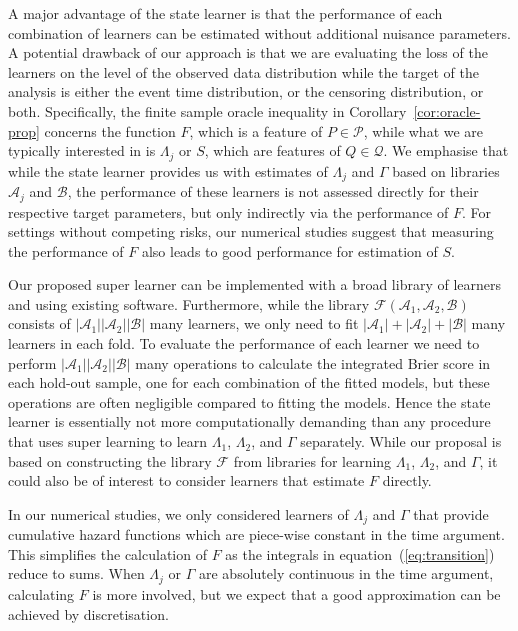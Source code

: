 \documentclass[a4paper,danish]{article}
\theoremstyle{plain} %
\numberwithin{theorem}{section}
\theoremstyle{definition} %
\theoremstyle{remark}
\newcommand{\1}{\mathds{1}}
\begin{document}
A major advantage of the state learner is that the performance of each
combination of learners can be estimated without additional nuisance
parameters. A potential drawback of our approach is that we are
evaluating the loss of the learners on the level of the observed data
distribution while the target of the analysis is either the event time
distribution, or the censoring distribution, or both.
Specifically, the finite sample oracle inequality in
Corollary~\ref{cor:oracle-prop} concerns the function \( F \), which
is a feature of \( P \in \mathcal{P} \), while what we are typically
interested in is \( \Lambda_j \) or \( S \), which are features of
\( Q \in \mathcal{Q} \). We emphasise that while the state learner
provides us with estimates of \( \Lambda_j \) and $\Gamma$ based on
libraries \( \mathcal{A}_j \) and \( \mathcal{B} \), the performance
of these learners is not assessed directly for their respective target
parameters, but only indirectly via the performance of \( F \).  For
settings without competing risks, our numerical studies suggest that
measuring the performance of \( F \) also leads to good performance
for estimation of \( S \).

Our proposed super learner can be implemented with a broad library of learners
and using existing software.
Furthermore, while
the library \( \mathcal{F}(\mathcal{A}_1,\mathcal{A}_2,\mathcal{B}) \) consists
of \( |\mathcal{A}_1||\mathcal{A}_2||\mathcal{B}| \) many learners, we only need to fit
\( |\mathcal{A}_1| +|\mathcal{A}_2| + |\mathcal{B}| \) many learners in each fold. To
evaluate the performance of each learner we need to perform
\( |\mathcal{A}_1||\mathcal{A}_2||\mathcal{B}| \) many operations to calculate the
integrated Brier score in each hold-out sample, one for each combination of the
fitted models, but these operations are often negligible compared to fitting the
models. Hence the state learner is essentially not more computationally demanding
than any procedure that uses super learning to learn $\Lambda_1$, $\Lambda_2$,
and $\Gamma$ separately. While our proposal is based on constructing the library
\( \mathcal{F} \) from libraries for learning \( \Lambda_1 \), $\Lambda_2$, and
$\Gamma$, it could also be of interest to consider learners that estimate
\( F \) directly.

In our numerical studies, we only considered learners of $\Lambda_j$ and
$\Gamma$ that provide cumulative hazard functions which are piece-wise constant
in the time argument. This simplifies the calculation of \( F \) as the
integrals in equation~(\ref{eq:transition}) reduce to sums. When $\Lambda_j$ or
\( \Gamma \) are absolutely continuous in the time argument, calculating \( F \)
is more involved, but we expect that a good approximation can be achieved by
discretisation.
\end{document}
